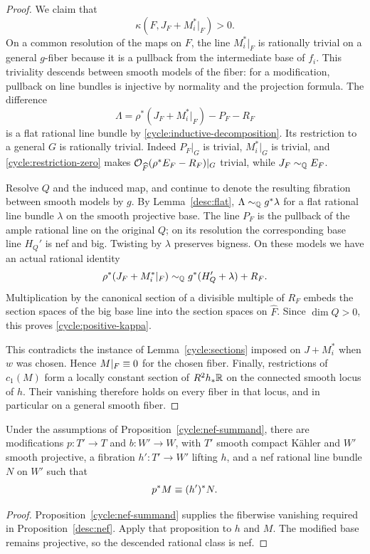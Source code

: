 \begin{proof}
We claim that
\begin{equation}\label{cycle:positive-kappa}
                         \kappa(F,J_F+M_i^*|_F)>0.
\end{equation}
On a common resolution of the maps on $F$, the line $M_i^*|_F$
is rationally trivial on a general $g$-fiber because it is a
pullback from the intermediate base of $f_i$.  This triviality
descends between smooth models of the fiber: for a modification,
pullback on line bundles is injective by normality and the
projection formula.  The difference
\[
             \Lambda=\rho^*(J_F+M_i^*|_F)-P_F-R_F
\]
is a flat rational line bundle by
\eqref{cycle:inductive-decomposition}.  Its restriction to a
general $G$ is rationally trivial.  Indeed $P_F|_G$ is trivial,
$M_i^*|_G$ is trivial, and
\eqref{cycle:restriction-zero} makes
$\mathcal O_{\widehat F}(\rho^*E_F-R_F)|_G$ trivial, while
$J_F\sim_{\mathbb Q} E_F$.

Resolve $Q$ and the induced map, and continue to denote the
resulting fibration between smooth models by $g$.  By Lemma~\ref{desc:flat},
$\Lambda\sim_{\mathbb Q} g^*\lambda$ for a flat rational line bundle
$\lambda$ on the smooth projective base.  The line $P_F$ is the
pullback of the ample rational line on the original $Q$; on its
resolution the corresponding base line $H_Q'$ is nef and big.
Twisting by $\lambda$ preserves bigness.  On these models we have
an actual rational identity
\[
                \rho^*(J_F+M_i^*|_F)
                        \sim_{\mathbb Q} g^*(H_Q'+\lambda)+R_F.
\]
Multiplication by the canonical section of a divisible multiple
of $R_F$ embeds the section spaces of the big base line into the
section spaces on $\widehat F$.  Since $\dim Q>0$, this proves
\eqref{cycle:positive-kappa}.

This contradicts the instance of Lemma~\ref{cycle:sections} imposed
on $J+M_i^*$ when $w$ was chosen.  Hence $M|_F\equiv0$ for the
chosen fiber.  Finally, restrictions of $c_1(M)$ form a
locally constant section of $R^2h_*\mathbb R$ on the connected smooth
locus of $h$.  Their vanishing therefore holds on every fiber in
that locus, and in particular on a general smooth fiber.
\end{proof}

\begin{corollary}\label{cycle:base-descent}
Under the assumptions of Proposition~\ref{cycle:nef-summand},
there are modifications $p:T'\to T$ and $b:W'\to W$, with
$T'$ smooth compact K\"ahler and $W'$ smooth projective, a
fibration $h':T'\to W'$ lifting $h$, and a nef rational line
bundle $N$ on $W'$ such that
\[
                              p^*M\equiv(h')^*N.
\]
\end{corollary}

\begin{proof}
Proposition~\ref{cycle:nef-summand} supplies the fiberwise
vanishing required in Proposition~\ref{desc:nef}.  Apply that
proposition to $h$ and $M$.  The modified base remains projective,
so the descended rational class is nef.
\end{proof}
